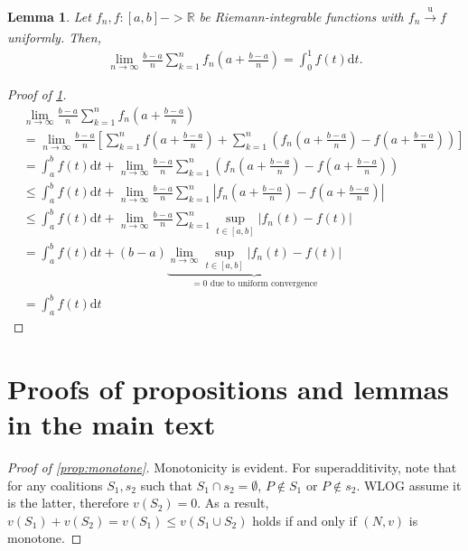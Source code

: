 \documentclass[a4paper]{article}
\newtheorem{lemma}{Lemma}
\newcommand{\dt}{\mathrm{d}t}
\begin{document}
\begin{lemma}
    \label{lemma:integral_convergence}
    Let $f_n, f: [a, b] -> \mathbb{R}$ be Riemann-integrable functions with $f_n \xrightarrow[]{\mathrm{u}} f$ uniformly.
    Then,
    \begin{align*}
        \lim_{n \to \infty} \frac{b-a}{n} \sum_{k=1}^n f_n \left( a + \frac{b-a}{n} \right) = \int_0^1 f(t) \dt.
    \end{align*}
\end{lemma}
\begin{proof}[Proof of \cref{lemma:integral_convergence}]
    \begin{align*}
        &\lim_{n \to \infty} \frac{b-a}{n} \sum_{k=1}^n f_n \left( a + \frac{b-a}{n} \right) \\
        &= \lim_{n \to \infty} \frac{b-a}{n} \left[ \sum_{k=1}^n f \left( a + \frac{b-a}{n} \right) + \sum_{k=1}^n \left( f_n \left( a + \frac{b-a}{n} \right) - f \left( a + \frac{b-a}{n} \right) \right) \right] \\
        &= \int_a^b f(t) \dt + \lim_{n \to \infty} \frac{b-a}{n}\sum_{k=1}^n \left( f_n \left( a + \frac{b-a}{n} \right) - f \left( a + \frac{b-a}{n} \right) \right) \\
        &\leq \int_a^b f(t) \dt + \lim_{n \to \infty} \frac{b-a}{n}\sum_{k=1}^n \left| f_n \left( a + \frac{b-a}{n} \right) - f \left( a + \frac{b-a}{n} \right) \right| \\
        &\leq \int_a^b f(t) \dt + \lim_{n \to \infty} \frac{b-a}{n}\sum_{k=1}^n \sup_{t \in [a, b]} \left| f_n(t) - f(t) \right| \\
        &= \int_a^b f(t) \dt + (b-a) \underbrace{\lim_{n \to \infty} \sup_{t \in [a, b]} \left| f_n(t) - f(t) \right|}_{=0 \text{ due to uniform convergence}} \\
        &= \int_a^b f(t) \dt
    \end{align*}
\end{proof}


\section{Proofs of propositions and lemmas in the main text}

\begin{proof}[Proof of \cref{prop:monotone}]
    Monotonicity is evident.
    For superadditivity, note that for any coalitions $S_1, s_2$ such that $S_1 \cap s_2 = \emptyset$, $P \notin S_1$ or $P \notin s_2$.
    WLOG assume it is the latter, therefore $v(S_2) = 0$.
    As a result, $v(S_1) + v(S_2) = v(S_1) \leq v(S_1 \cup S_2)$ holds if and only if $(N, v)$ is monotone.
\end{proof}
\end{document}
